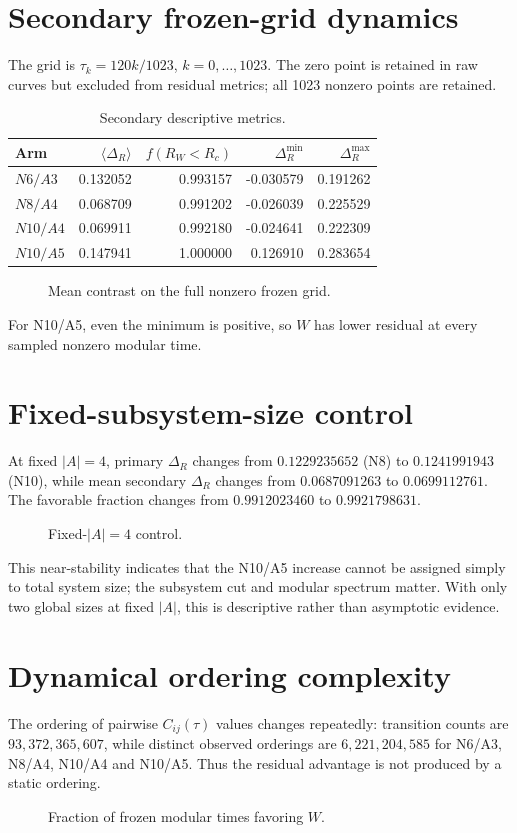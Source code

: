 \documentclass[11pt,a4paper]{article}
\begin{document}
\section{Secondary frozen-grid dynamics}
The grid is $\tau_k=120k/1023$, $k=0,\ldots,1023$. The zero point is retained in raw curves but excluded from residual metrics; all 1023 nonzero points are retained.
\begin{table}[ht]\centering\caption{Secondary descriptive metrics.}\begin{tabular}{lrrrr}\toprule Arm&$\langle\Delta_R\rangle$&$f(R_W<R_c)$&$\Delta_R^{\min}$&$\Delta_R^{\max}$\\\midrule
$N6/A3$&0.132052&0.993157&-0.030579&0.191262\\
$N8/A4$&0.068709&0.991202&-0.026039&0.225529\\
$N10/A4$&0.069911&0.992180&-0.024641&0.222309\\
$N10/A5$&0.147941&1.000000&0.126910&0.283654\\\bottomrule\end{tabular}\end{table}
\begin{figure}[ht]\centering\caption{Mean contrast on the full nonzero frozen grid.}\end{figure}
For N10/A5, even the minimum is positive, so $W$ has lower residual at every sampled nonzero modular time.
\section{Fixed-subsystem-size control}
At fixed $|A|=4$, primary $\Delta_R$ changes from $0.1229235652$ (N8) to $0.1241991943$ (N10), while mean secondary $\Delta_R$ changes from $0.0687091263$ to $0.0699112761$. The favorable fraction changes from $0.9912023460$ to $0.9921798631$.
\begin{figure}[ht]\centering\caption{Fixed-$|A|=4$ control.}\end{figure}
This near-stability indicates that the N10/A5 increase cannot be assigned simply to total system size; the subsystem cut and modular spectrum matter. With only two global sizes at fixed $|A|$, this is descriptive rather than asymptotic evidence.
\section{Dynamical ordering complexity}
The ordering of pairwise $C_{ij}(\tau)$ values changes repeatedly: transition counts are $93,372,365,607$, while distinct observed orderings are $6,221,204,585$ for N6/A3, N8/A4, N10/A4 and N10/A5. Thus the residual advantage is not produced by a static ordering.
\begin{figure}[ht]\centering\caption{Fraction of frozen modular times favoring $W$.}\end{figure}
\end{document}
